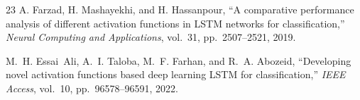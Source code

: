\documentclass[conference]{IEEEtran}
\begin{document}
\begin{thebibliography}{23}
A. Farzad, H. Mashayekhi, and H. Hassanpour,
``A comparative performance analysis of different activation functions in
LSTM networks for classification,''
\textit{Neural Computing and Applications}, vol.~31,
pp.~2507--2521, 2019.

M.~H. Essai~Ali, A.~I. Taloba, M.~F. Farhan, and R.~A. Abozeid,
``Developing novel activation functions based deep learning LSTM for
classification,''
\textit{IEEE Access}, vol.~10, pp.~96578--96591, 2022.

\end{thebibliography}
\end{document}
